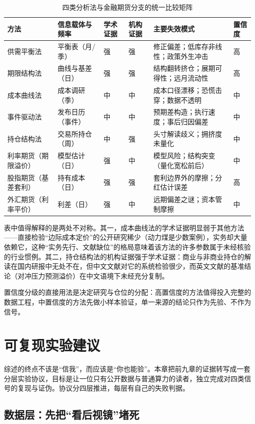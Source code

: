 \documentclass[12pt,a4paper]{ctexart}
\begin{document}
\begin{longtable}{p{2.6cm}p{2.6cm}p{1.6cm}p{1.6cm}p{3.4cm}p{1.6cm}}
\caption{四类分析法与金融期货分支的统一比较矩阵}\label{tab:matrix}\\
\toprule
方法 & 信息载体与频率 & 学术证据 & 机构证据 & 主要失效模式 & 置信度 \\
\midrule
\endhead
供需平衡法 & 平衡表（月/季） & 强 & 强 & 修正偏差；低库存非线性；政策外生冲击 & 高 \\
期限结构法 & 曲线与基差（日） & 强 & 强 & 结构翻转挤仓；展期可得性；远月流动性 & 高 \\
成本曲线法 & 成本调研（季） & 中 & 中 & 成本口径漂移；恐慌击穿；数据不透明 & 中 \\
事件驱动法 & 发布日历（事件） & 中 & 中 & 预期差构造；执行速度；事后归因偏差 & 中 \\
持仓结构法 & 交易所持仓（周） & 中 & 强 & 头寸解读歧义；拥挤度未量化 & 中 \\
利率期货（期限溢价） & 模型估计（日） & 强 & 中 & 模型风险；结构突变（量化宽松前后） & 中 \\
股指期货（基差套利） & 持有成本（日） & 强 & 强 & 套利边界外的摩擦；分红估计误差 & 高 \\
外汇期货（利率平价） & 利差（日） & 强 & 中 & 远期偏差之谜；资本管制摩擦 & 中 \\
\bottomrule
\end{longtable}

表中值得解释的是两处不对称。其一，成本曲线法的学术证据明显弱于其他方法——直接检验“边际成本定价”的公开研究稀少（动力煤是少数案例\cite{20}），实务却大量依赖它，这种“实务先行、文献缺位”的格局意味着该方法的许多参数属于未经核验的行业惯例。其二，持仓结构法的机构证据强于学术证据：商业与非商业持仓的解读在国内研报中无处不在，但中文文献对它的系统检验很少，而英文文献的基准结论（对冲压力预测溢价\cite{10, 38}）在中文语境下未经充分复制。

置信度分级的直接用法是决定研究与仓位的分配：高置信度的方法值得投入完整的数据工程，中置信度的方法先做小样本验证，单一来源的结论只作为先验、不作为信号。

\section{可复现实验建议}

综述的终点不该是“信我”，而应该是“你也能验”。本章把前九章的证据转写成一套分层实验协议，目标是让一位只有公开数据与普通算力的读者，独立完成对四类信号的复现与证伪。协议分四层推进，每层有自己的失败判据。

\subsection{数据层：先把“看后视镜”堵死}
\end{document}
